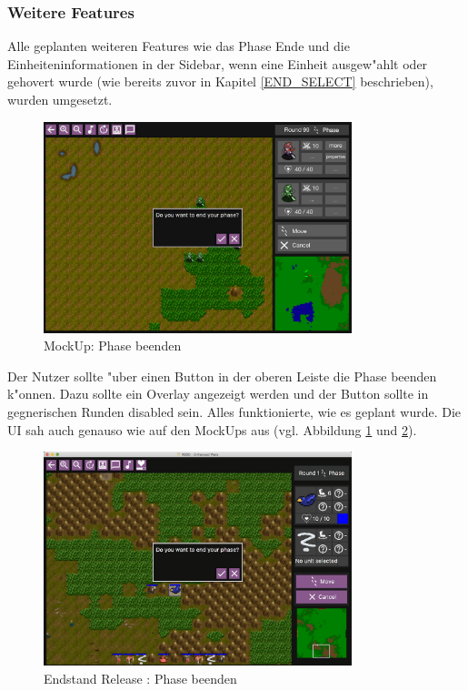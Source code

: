 \documentclass[12pt, titlepage]{scrartcl}
\newcommand{\RN}[1]{%
	\textup{\uppercase\expandafter{\romannumeral#1}}%
}
\newcounter{subsubsubsection}[subsubsection]
\begin{document}
			\subsubsection{Weitere Features}
				Alle geplanten weiteren Features wie das Phase Ende und die Einheiteninformationen in der Sidebar, wenn eine Einheit ausgew"ahlt oder gehovert wurde (wie bereits zuvor in Kapitel \ref{END_SELECT} beschrieben), wurden umgesetzt.
				\begin{figure}[H] 
					\centering
					\includegraphics[width=0.8\textwidth]{images/mockUps/EndPhase.png}
					\caption{MockUp: Phase beenden}
					\label{Phase_End_2}
				\end{figure}
					Der Nutzer sollte "uber einen Button in der oberen Leiste die Phase beenden k"onnen. Dazu sollte ein Overlay angezeigt werden und der Button sollte in gegnerischen Runden disabled sein. Alles funktionierte, wie es geplant wurde. Die UI sah auch genauso wie auf den MockUps aus (vgl. Abbildung \ref{Phase_End_2} und \ref{End_Phase_End}).
					\begin{figure}[H] 
						\centering
						\includegraphics[width=0.8\textwidth]{images/endOfRelease/EndPhase.png}
						\caption{Endstand Release \RN{3}: Phase beenden}
						\label{End_Phase_End}
					\end{figure}
\end{document}
